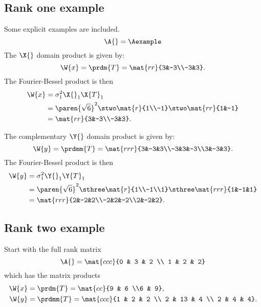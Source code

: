\subsection{Rank one example}
Some explicit examples are included.
\begin{equation}
  \A{}=\Aexample
\end{equation}
The $\X{}$ domain product is given by:
\begin{equation}
  \W{x} = \prdm{T} = \mat{rr}{3&-3\\-3&3}.
\end{equation}
The Fourier-Bessel product is then
\begin{equation}
  \begin{split}
    \W{x} &= \sigma_{1}^{2} \X{}_{1}\X{T}_{1}\\
      &= \paren{\sqrt{6}}^{2} \stwo \mat{r}{1\\-1}\stwo \mat{rr}{1&-1}\\
      &= \mat{rr}{3&-3\\-3&3}.
  \end{split}
\end{equation}

The complementary $\Y{}$ domain product is given by:
\begin{equation}
  \W{y} = \prdmm{T} = \mat{rrr}{3&-3&3\\-3&3&-3\\3&-3&3}.
\end{equation}
The Fourier-Bessel product is then
\begin{equation}
  \begin{split}
    \W{y} &= \sigma_{1}^{2} \Y{}_{1}\Y{T}_{1}\\
      &= \paren{\sqrt{6}}^{2} \sthree \mat{r}{1\\-1\\1} \sthree \mat{rrr}{1&-1&1}\\
      &= \mat{rrr}{2&-2&2\\-2&2&-2\\2&-2&2}.
  \end{split}
\end{equation}

\subsection{Rank two example}
Start with the full rank matrix
\begin{equation}
  \A{} = \mat{ccc}{0 & 3 & 2 \\ 1 & 2 & 2}
\end{equation}
which has the matrix products
\begin{equation}
  \begin{split}
    \W{x} &= \prdm{T}  = \mat{cc}{9 & 6 \\6 & 9},\\
    \W{y} &= \prdmm{T} = \mat{ccc}{1 & 2 & 2 \\ 2 & 13 & 4 \\ 2 & 4 & 4}.
  \end{split}
\end{equation}

